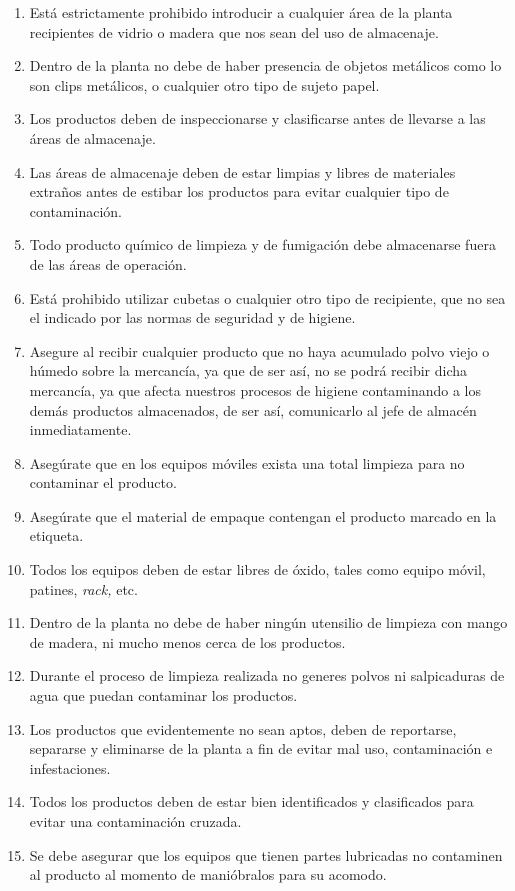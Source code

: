 \begin{enumerate}
	\item Está estrictamente prohibido introducir a cualquier área de la planta recipientes de vidrio o madera que nos sean del uso de almacenaje.
	\item Dentro de la planta no debe de haber presencia de objetos metálicos como lo son clips metálicos, o cualquier otro tipo de sujeto papel.
	\item Los productos deben de inspeccionarse y clasificarse antes de llevarse a las áreas de almacenaje.
	\item Las áreas de almacenaje deben de estar limpias y libres de materiales extraños antes de estibar los productos para evitar cualquier tipo de contaminación.
	\item Todo producto químico de limpieza y de fumigación debe almacenarse fuera de las áreas de operación.
	\item Está prohibido utilizar cubetas o cualquier otro tipo de recipiente, que no sea el indicado por las normas de seguridad y de higiene.
	\item Asegure al recibir cualquier producto que no haya acumulado polvo viejo o húmedo sobre la mercancía, ya que de ser así, no se podrá recibir dicha mercancía, ya que afecta nuestros procesos de higiene contaminando a los demás productos almacenados, de ser así, comunicarlo al jefe de almacén inmediatamente.
	\item Asegúrate que en los equipos móviles exista una total limpieza para no contaminar el producto.
	\item Asegúrate que el material de empaque contengan el producto marcado en la etiqueta.
	\item Todos los equipos deben de estar libres de óxido, tales como equipo móvil, patines, \textit{rack,} etc.
	\item Dentro de la planta no debe de haber ningún utensilio de limpieza con mango de madera, ni mucho menos cerca de los productos.
	\item Durante el proceso de limpieza realizada no generes polvos ni salpicaduras de agua que puedan contaminar los productos.
	\item Los productos que evidentemente no sean aptos, deben de reportarse, separarse y eliminarse de la planta a fin de evitar mal uso, contaminación e infestaciones.
	\item Todos los productos deben de estar bien identificados y clasificados para evitar una contaminación cruzada.
	\item Se debe asegurar que los equipos que tienen partes lubricadas no contaminen al producto al momento de manióbralos para su acomodo.

\end{enumerate}
